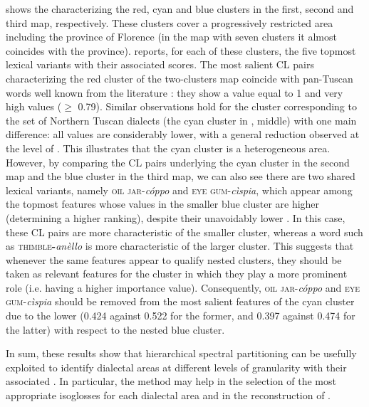 \documentclass[output=paper]{LSP/langsci}
\begin{document}
\largerpage[-1]%

 shows the  characterizing the red, cyan and blue clusters in the first, second and third map, respectively. These clusters cover a progressively restricted area including the province of Florence (in the map with seven clusters it almost coincides with the province).  reports, for each of these clusters, the five topmost lexical variants with their associated scores. The most salient CL pairs characterizing the red cluster of the two-clusters map coincide with pan-Tuscan words well known from the literature \citep{giacomelli_parole_1984}: they show a  value equal to 1 and very high  values (${\geq}$ 0.79). Similar observations hold for the cluster corresponding to the set of Northern Tuscan dialects (the cyan cluster in , middle) with one main difference: all values are considerably lower, with a general reduction observed at the level of . This illustrates that the cyan cluster is a heterogeneous area. However, by comparing the CL pairs underlying the cyan cluster in the second map and the blue cluster in the third map, we can also see there are two shared lexical variants, namely \textsc{oil jar}{}-\textit{cóppo }and \textsc{eye gum}{}-\textit{cìspia}, which appear among the topmost features whose  values in the smaller blue cluster are higher (determining a higher ranking), despite their unavoidably lower . In this case, these CL pairs are more characteristic of the smaller cluster, whereas a word such as \textsc{thimble}\textbf{\textsc{{}-}}\textit{anèllo }is more characteristic of the larger cluster. This suggests that whenever the same features appear to qualify nested clusters, they should be taken as relevant features for the cluster in which they play a more prominent role (i.e. having a higher importance value). Consequently, \textsc{oil jar}{}-\textit{cóppo }and \textsc{eye gum}{}-\textit{cìspia }should be removed from the most salient features of the cyan cluster due to the lower  (0.424 against 0.522 for the former, and 0.397 against 0.474 for the latter) with respect to the nested blue cluster.

In sum, these results show that hierarchical spectral partitioning can be usefully exploited to identify dialectal areas at different levels of granularity with their associated . In particular, the method may help in the selection of the most appropriate isoglosses for each dialectal area and in the reconstruction of .
\end{document}
